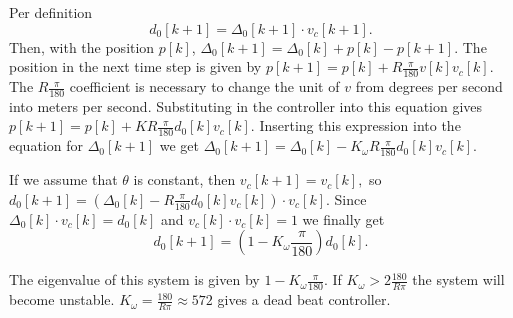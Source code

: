 
Per definition
\[
d_0[k+1] = \Delta_0[k+1] \cdot v_c[k+1].
\]
Then, with the position $p[k]$, $\Delta_0[k+1] = \Delta_0[k] + p[k] - p[k+1].$ 
The position in the next time step is given by $p[k+1] = p[k] + R\frac{\pi}{180}v[k] v_c[k].$ The $R\frac{\pi}{180}$ coefficient is necessary to change the unit of $v$ from degrees per second into meters per second. Substituting in the controller into this equation gives $p[k+1] = p[k] + KR\frac{\pi}{180}d_0[k] v_c[k].$
Inserting this expression into the equation for $\Delta_0[k+1]$ we get $\Delta_0[k+1] = \Delta_0[k] - K_\omega R\frac{\pi}{180}d_0[k] v_c[k].$

If we assume that $\theta$ is constant, then $v_c[k+1] = v_c[k],$
so $d_0 [k+1] = (\Delta_0[k] - R\frac{\pi}{180}d_0[k] v_c[k])\cdot v_c[k].$ Since $\Delta_0[k] \cdot v_c[k] = d_0[k]$ and $v_c[k]\cdot v_c[k] = 1$ we finally get
\begin{equation*}
d_0 [k+1] = (1-K_\omega \frac{\pi}{180})d_0[k].
\end{equation*}

The eigenvalue of this system is given by $1-K_\omega \frac{\pi}{180}.$ If $K_\omega > 2\frac{180}{R \pi}$ the system will become unstable. $K_\omega = \frac{180}{R \pi} \approx 572$ gives a dead beat controller.
